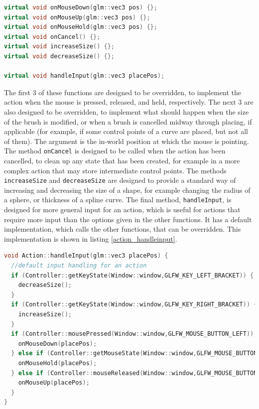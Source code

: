 \documentclass{article}
\begin{document}
\begin{lstlisting}[language=C++,label={action_methods},caption={The methods of the \texttt{Action} class responsible for handling user interaction}]
virtual void onMouseDown(glm::vec3 pos) {};
virtual void onMouseUp(glm::vec3 pos) {};
virtual void onMouseHold(glm::vec3 pos) {};
virtual void onCancel() {};
virtual void increaseSize() {};
virtual void decreaseSize() {};

virtual void handleInput(glm::vec3 placePos);
\end{lstlisting}
The first 3 of these functions are designed to be overridden, to implement the action when the mouse is pressed, released, and held, respectively. The next 3 are also designed to be overridden, to implement what should happen when the size of the brush is modified, or when a brush is cancelled midway through placing, if applicable (for example, if some control points of a curve are placed, but not all of them). The argument is the in-world position at which the mouse is pointing. The method \texttt{onCancel} is designed to be called when the action has been cancelled, to clean up any state that has been created, for example in a more complex action that may store intermediate control points. The methods \texttt{increaseSize} and \texttt{decreaseSize} are designed to provide a standard way of increasing and decreasing the size of a shape, for example changing the radius of a sphere, or thickness of a spline curve. The final method, \texttt{handleInput}, is designed for more general input for an action, which is useful for actions that require more input than the options given in the other functions. It has a default implementation, which calls the other functions, that can be overridden. This implementation is shown in listing \ref{action_handleinput}.
\begin{lstlisting}[language=C++,label={action_handleinput},caption={Default implementation of \texttt{handleInput}}]
void Action::handleInput(glm::vec3 placePos) {
  //default input handling for an action
  if (Controller::getKeyState(Window::window,GLFW_KEY_LEFT_BRACKET)) {
    decreaseSize();
  }
  if (Controller::getKeyState(Window::window,GLFW_KEY_RIGHT_BRACKET)) {
    increaseSize();
  }
  if (Controller::mousePressed(Window::window,GLFW_MOUSE_BUTTON_LEFT)) {
    onMouseDown(placePos);
  } else if (Controller::getMouseState(Window::window,GLFW_MOUSE_BUTTON_LEFT)) {
    onMouseHold(placePos);
  } else if (Controller::mouseReleased(Window::window,GLFW_MOUSE_BUTTON_LEFT)) {
    onMouseUp(placePos);
  }
}
\end{lstlisting}
\end{document}

